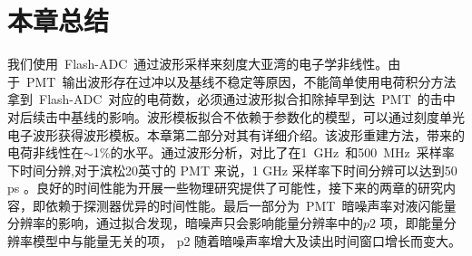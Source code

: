 \section{本章总结}
我们使用~Flash-ADC~通过波形采样来刻度大亚湾的电子学非线性。由于~PMT~输出波形存在过冲以及基线不稳定等原因，不能简单使用电荷积分方法拿到~Flash-ADC~对应的电荷数，必须通过波形拟合扣除掉早到达~PMT~的击中对后续击中基线的影响。波形模板拟合不依赖于参数化的模型，可以通过刻度单光电子波形获得波形模板。本章第二部分对其有详细介绍。该波形重建方法，带来的电荷非线性在$\sim$1\%的水平。通过波形分析，对比了在1~GHz~和500~MHz~采样率下时间分辨,对于滨松20英寸的 PMT 来说，1 GHz 采样率下时间分辨可以达到50 ps 。良好的时间性能为开展一些物理研究提供了可能性，接下来的两章的研究内容，即依赖于探测器优异的时间性能。最后一部分为~PMT~暗噪声率对液闪能量分辨率的影响，通过拟合发现，暗噪声只会影响能量分辨率中的$p2$ 项，即能量分辨率模型中与能量无关的项， p2 随着暗噪声率增大及读出时间窗口增长而变大。
